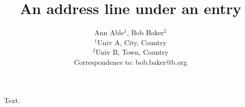\documentclass{article}
\begin{document}
\title{An address line under an entry}
\author{Ann Able$^1$, Bob Baker$^2$\\
$^1$Univ A, City, Country\\
$^2$Univ B, Town, Country\\
Correspondence to: bob.baker@b.org}
\maketitle
Text.
\end{document}
